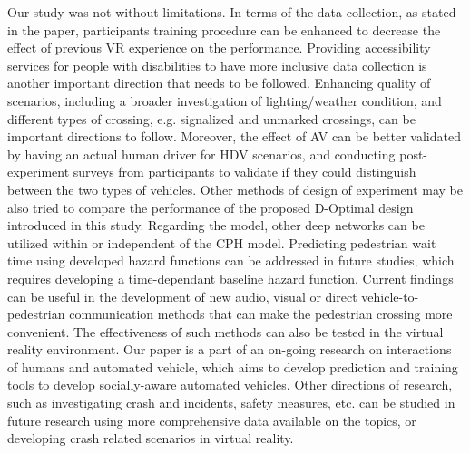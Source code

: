 Our study was not without limitations. In terms of the data collection, as stated in the paper, participants training procedure can be enhanced to decrease the effect of previous VR experience on the performance. Providing accessibility services for people with disabilities to have more inclusive data collection is another important direction that needs to be followed. Enhancing quality of scenarios, including a broader investigation of lighting/weather condition, and different types of crossing, e.g. signalized and unmarked crossings, can be important directions to follow. Moreover, the effect of AV can be better validated by having an actual human driver for HDV scenarios, and conducting post-experiment surveys from participants to validate if they could distinguish between the two types of vehicles. Other methods of design of experiment may be also tried to compare the performance of the proposed D-Optimal design introduced in this study. Regarding the model, other deep networks can be utilized within or independent of the CPH model. Predicting pedestrian wait time using developed hazard functions can be addressed in future studies, which requires developing a time-dependant baseline hazard function. Current findings can be useful in the development of new audio, visual or direct vehicle-to-pedestrian communication methods that can make the pedestrian crossing more convenient. The effectiveness of such methods can also be tested in the virtual reality environment. Our paper is a part of an on-going research on interactions of humans and automated vehicle, which aims to develop prediction and training tools to develop socially-aware automated vehicles. Other directions of research, such as investigating crash and incidents, safety measures, etc. can be studied in future research using more comprehensive data available on the topics, or developing crash related scenarios in virtual reality.